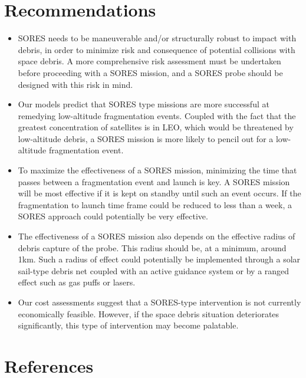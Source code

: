 \documentclass[12pt]{scrartcl}
\begin{document}
\section{Recommendations} \label{sec:recommendations}
\begin{itemize}
    \item SORES needs to be maneuverable and/or structurally robust to impact with debris, in order to minimize risk and consequence of potential collisions with space debris. A more comprehensive risk assessment must be undertaken before proceeding with a SORES mission, and a SORES probe should be designed with this risk in mind.
    \item Our models predict that SORES type missions are more successful at remedying low-altitude fragmentation events. Coupled with the fact that the greatest concentration of satellites is in LEO, which would be threatened by low-altitude debris, a SORES mission is more likely to pencil out for a low-altitude fragmentation event.
    \item To maximize the effectiveness of a SORES mission, minimizing the time that passes between a fragmentation event and launch is key. A SORES mission will be most effective if it is kept on standby until such an event occurs. If the fragmentation to launch time frame could be reduced to less than a week, a SORES approach could potentially be very effective. 
    \item The effectiveness of a SORES mission also depends on the effective radius of debris capture of the probe. This radius should be, at a minimum, around 1km. Such a radius of effect could potentially be implemented through a solar sail-type debris net coupled with an active guidance system or by a ranged effect such as gas puffs or lasers.
    \item Our cost assessments suggest that a SORES-type intervention is not currently economically feasible. However, if the space debris situation deteriorates significantly, this type of intervention may become palatable.
\end{itemize}

\section{References}
\end{document}
